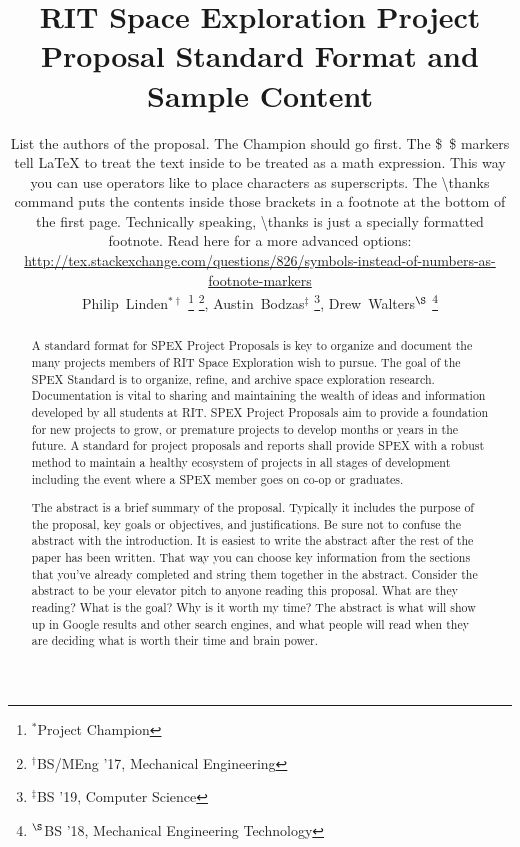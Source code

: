 \documentclass[journal]{SPEXformat}
\title{RIT Space Exploration Project Proposal Standard Format and Sample Content}
\author{
  \begin{help}
    List the authors of the proposal. The Champion should go first.
    The \$~\$ markers tell \LaTeX{} to treat the text inside to be treated as a math expression. This way you can use operators like \textcaret{} to place characters as superscripts.
    The \textbackslash{}thanks command puts the contents inside those brackets in a footnote at the bottom of the first page. Technically speaking, \textbackslash{}thanks is just a specially formatted footnote.
    Read here for a more advanced options:  \url{http://tex.stackexchange.com/questions/826/symbols-instead-of-numbers-as-footnote-markers}
  \end{help}
  Philip~Linden$^{*\dagger}$%
    \thanks{$^{*}$Project Champion}%
    \thanks{$^{\dagger}$BS/MEng '17, Mechanical Engineering},
  Austin~Bodzas$^{\ddagger}$%
    \thanks{$^{\ddagger}$BS '19, Computer Science},
  Drew~Walters$^{\S}$%
    \thanks{$^{\S}$BS '18, Mechanical Engineering Technology}
}
\newenvironment{help}{
  \ttfamily\footnotesize\sloppy
  \begin{lrbox}{\helpbox}\begin{minipage}{\linewidth}
  }{
  \end{minipage}\end{lrbox}
  \ifbool{showhelp}{
    \fbox{\usebox{\helpbox}}
  }{}
}
\begin{document}
\maketitle%

\begin{abstract}
  A standard format for SPEX Project Proposals is key to organize and document the many projects members of RIT Space Exploration wish to pursue.
  The goal of the SPEX Standard is to organize, refine, and archive space exploration research.
  Documentation is vital to sharing and maintaining the wealth of ideas and information developed by all students at RIT.\@
  SPEX Project Proposals aim to provide a foundation for new projects to grow, or premature projects to develop months or years in the future.
  A standard for project proposals and reports shall provide SPEX with a robust method to maintain a healthy ecosystem of projects in all stages of development including the event where a SPEX member goes on co-op or graduates.
    \begin{help}
      The abstract is a brief summary of the proposal. Typically it includes the purpose of the proposal, key goals or objectives, and justifications.
      Be sure not to confuse the abstract with the introduction.
      It is easiest to write the abstract after the rest of the paper has been written.
      That way you can choose key information from the sections that you've already completed and string them together in the abstract.
      Consider the abstract to be your elevator pitch to anyone reading this proposal.
      What are they reading?
      What is the goal?
      Why is it worth my time?
      The abstract is what will show up in Google results and other search engines, and what people will read when they are deciding what is worth their time and brain power.
    \end{help}
\end{abstract}

\label{sec:nomenclature}
\newcommand{\nomunit}[1]{%
\renewcommand{\nomentryend}{\hspace*{\fill}#1}}
\renewcommand{\nompreamble}{
  \begin{help}
    If you include mathematical expressions or express variables in the proposal, list them with their corresponding definitions here as a list.
    The two lines below make it look nice when defining units/values to constants.

    Note that math terms and non-math terms are separated and alphabetized, regardless of the order in which they are defined. (Recall terms \$like this\$ are in the math environment)
    Read more about advanced nomenclature formatting here:\\
    \url{https://www.sharelatex.com/learn/Nomenclatures}
  \end{help}
  }
\nomenclature{$c$}{Speed of light
 \nomunit{\,\SI{2.9979e8}{\meter\per\second}}}
\end{document}
